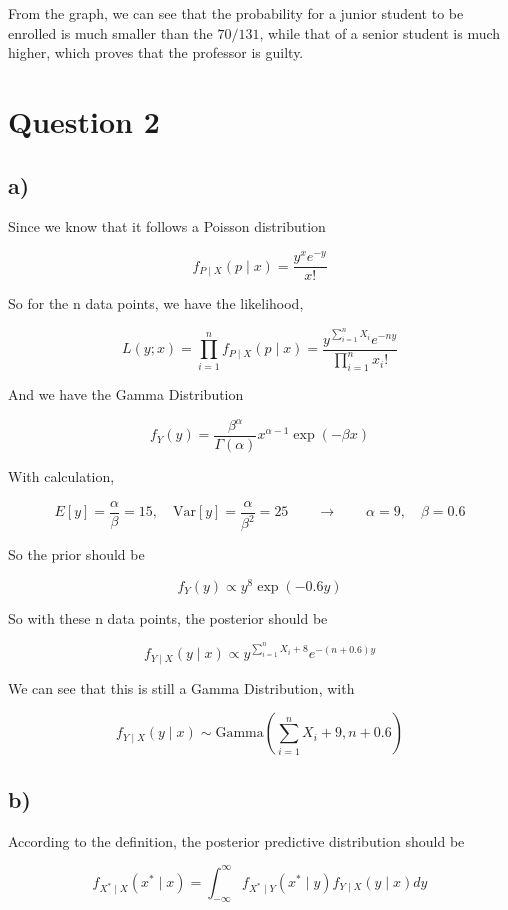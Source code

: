 \documentclass[12pt]{article}
\begin{document}
\begin{flushleft}
\qquad From the graph, we can see that the probability for a junior student to be enrolled is much smaller than the $70/131$, while that of a senior student is much higher, which proves that the professor is guilty.

\newpage

\section{Question 2}

\subsection*{a)}

\qquad Since we know that it follows a Poisson distribution

$$
f_{P\mid X}(p\mid x) = \frac{y^xe^{-y}}{x!}
$$

\qquad So for the n data points, we have the likelihood,

$$
L(y; x) = \prod_{i=1}^n f_{P\mid X}(p\mid x) = \frac{y^{\sum_{i=1}^n X_i}e^{-ny}}{\prod_{i=1}^n x_i!}
$$

\qquad And we have the Gamma Distribution

$$
f_{Y}(y) = \frac{\beta^\alpha}{\Gamma(\alpha)} x^{\alpha-1}\exp (-\beta x)
$$

\qquad With calculation, 

$$
E[y] = \frac{\alpha}{\beta} = 15, \quad \text{Var}[y]= \frac{\alpha}{\beta^2} = 25 \qquad \longrightarrow \qquad  \alpha = 9, \quad \beta = 0.6
$$

\qquad So the prior should be 

$$
f_Y(y) \propto y^8 \exp(-0.6 y)
$$

\qquad So with these n data points, the posterior should be

$$
f_{Y\mid X}(y\mid x) \propto y^{\sum_{i=1}^n X_i + 8}e^{-(n+0.6)y}
$$

\qquad We can see that this is still a Gamma Distribution, with

$$
f_{Y\mid X}(y\mid x) \sim \text{Gamma}(\sum_{i=1}^n X_i + 9, n+0.6)
$$

\subsection*{b)}

\qquad According to the definition, the posterior predictive distribution should be

$$
f_{X^{*}\mid X}(x^{*}\mid x) = \int_{-\infty}^{\infty}f_{X^{*}\mid Y}(x^{*}\mid y) f_{Y \mid X}(y\mid x)dy
$$


\end{flushleft}
\end{document}
